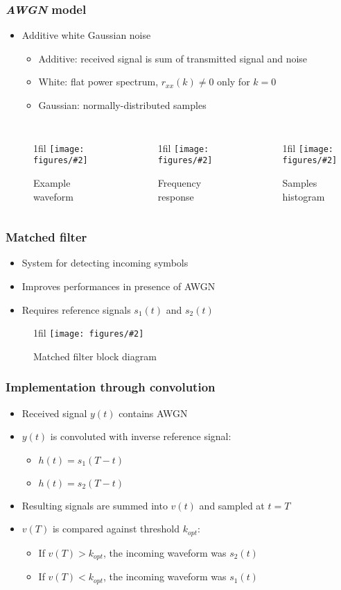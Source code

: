 \documentclass{beamer}
\makeatletter
\newcommand*{\centerfloat}{%
  \parindent \z@
  \leftskip \z@ \@plus 1fil \@minus \textwidth
  \rightskip\leftskip
  \parfillskip \z@skip}
\newcommand{\fig}[3]{
  \begin{figure}[H]
  \centerfloat
    \texttt{[image: figures/\#2]}
	\caption{#3}
  \end{figure}
}
\makeatother
\begin{document}
\begin{frame}
	\frametitle{\emph{AWGN} model}
	\begin{itemize}
		\item Additive white Gaussian noise
		\begin{itemize}
			\item Additive: received signal is sum of transmitted signal and noise
			\item White: flat power spectrum, $r_{xx}(k) \neq 0$ only for $k = 0$
			\item Gaussian: normally-distributed samples
		\end{itemize}
	\end{itemize}
	\begin{columns}
			\fig{2.75cm}{awgn_n.png}{Example waveform}
			\fig{2.75cm}{awgn_f.png}{Frequency response}
			\fig{2.75cm}{awgn_h.png}{Samples histogram}
	\end{columns}
\end{frame}

\begin{frame}
	\frametitle{Matched filter}
	\begin{itemize}
		\item System for detecting incoming symbols
		\item Improves performances in presence of AWGN
		\item Requires reference signals $s_1(t)$ and $s_2(t)$
	\end{itemize}
	\fig{4cm}{mf_block.png}{Matched filter block diagram}
\end{frame}

\begin{frame}
	\frametitle{Implementation through convolution}
	\begin{itemize}
		\item Received signal $y(t)$ contains AWGN
		\item $y(t)$ is convoluted with inverse reference signal:
		\begin{itemize}
			\item $h(t) = s_1(T - t)$
			\item $h(t) = s_2(T - t)$
		\end{itemize}
		\item Resulting signals are summed into $v(t)$ and sampled at $t = T$
		\item $v(T)$ is compared against threshold $k_{opt}$:
		\begin{itemize}
			\item If $v(T) > k_{opt}$, the incoming waveform was $s_2(t)$
			\item If $v(T) < k_{opt}$, the incoming waveform was $s_1(t)$
		\end{itemize}
	\end{itemize}
\end{frame}
\end{document}
